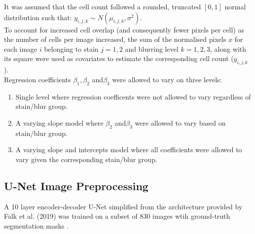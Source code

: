 \documentclass[isoft]{poster_class_UofC}
\begin{document}
\begin{poster}
 It was assumed that the cell count followed a rounded, truncated $[0,1]$ normal distribution such that: $y_{i,j,k} \sim N(\mu_{i,j,k}, \sigma^2)$. \\

 To account for increased cell overlap (and consequently fewer pixels per cell) as the number of cells per image increased, the sum of the normalised pixels $x$ for each image $i$ belonging to stain $j = 1,2$ and blurring level $k=1,2,3$, along with its square were used as covariates to estimate the corresponding cell count ($y_{i,j,k}$).\\

 Regression coefficients $\beta_1, \beta_2$ and$\beta_3$ were allowed to vary on three levels: 
\begin{adjustwidth}{2cm}{}
\begin{enumerate}
 \item Single level where regression coefficents were not allowed to vary regardless of stain/blur group.
 \item A varying slope model where $\beta_2 $ and$\beta_3$ were allowed to vary based on stain/blur group.
 \item A varying slope and intercepts model where all coefficients were allowed to vary given the corresponding stain/blur group.
\end{enumerate} 
\end{adjustwidth}
     

        \subsection{U-Net Image Preprocessing}
 A 10 layer encoder-decoder U-Net simplified from the architecture provided by 
Falk et al. (2019) \cite{FalkThorsten2019Udlf} was trained on a subset of 830 images wtih ground-truth segmentation masks \cite{VebjornLjosa2012Ahmi}.


\end{poster}
\end{document}
